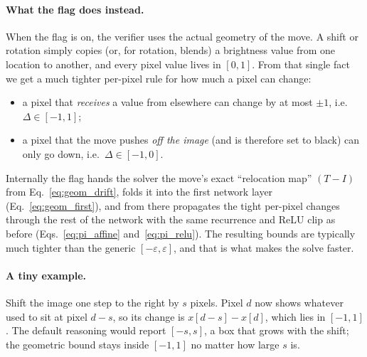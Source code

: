 \documentclass[11pt]{article}
\newcommand{\ep}{\varepsilon}
\begin{document}
\paragraph{What the flag does instead.}
When the flag is on, the verifier uses the actual geometry of the move. A shift or rotation simply
copies (or, for rotation, blends) a brightness value from one location to another, and every pixel
value lives in $[0,1]$. From that single fact we get a much tighter per-pixel rule for how much a
pixel can change:
\begin{itemize}[noitemsep,topsep=2pt]
  \item a pixel that \emph{receives} a value from elsewhere can change by at most $\pm 1$, i.e.\
        $\Delta \in [-1, 1]$;
  \item a pixel that the move pushes \emph{off the image} (and is therefore set to black) can only go
        down, i.e.\ $\Delta \in [-1, 0]$.
\end{itemize}
Internally the flag hands the solver the move's exact ``relocation map'' $(T-I)$ from
Eq.~\eqref{eq:geom_drift}, folds it into the first network layer (Eq.~\eqref{eq:geom_first}), and from
there propagates the tight per-pixel changes through the rest of the network with the same recurrence
and ReLU clip as before (Eqs.~\eqref{eq:pi_affine} and~\eqref{eq:pi_relu}). The resulting bounds are
typically much tighter than the generic $[-\ep,\ep]$, and that is what makes the solve faster.

\paragraph{A tiny example.}
Shift the image one step to the right by $s$ pixels. Pixel $d$ now shows whatever used to sit at pixel
$d-s$, so its change is $x[d-s] - x[d]$, which lies in $[-1, 1]$. The default reasoning would report
$[-s, s]$, a box that grows with the shift; the geometric bound stays inside $[-1, 1]$ no matter how
large $s$ is.
\end{document}
